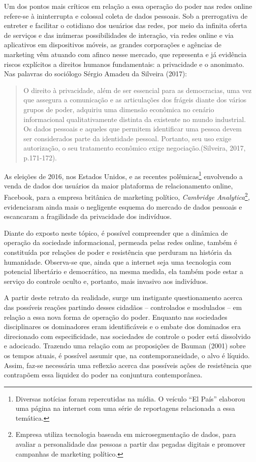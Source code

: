 Um dos pontos mais críticos em relação a essa operação do poder nas
redes online refere-se à ininterrupta e colossal coleta de dados
pessoais. Sob a prerrogativa de entreter e facilitar o cotidiano dos
usuários das redes, por meio da infinita oferta de serviços e das
inúmeras possibilidades de interação, via redes online e via aplicativos
em dispositivos móveis, as grandes corporações e agências de marketing
vêm atuando com afinco nesse mercado, que representa e já evidência
riscos explícitos a direitos humanos fundamentais: a privacidade e o
anonimato. Nas palavras do sociólogo Sérgio Amadeu da Silveira (2017):

\begin{quote}
O direito à privacidade, além de ser essencial para as democracias, uma
vez que assegura a comunicação e as articulações dos frágeis diante dos
vários grupos de poder, adquiriu uma dimensão econômica no cenário
informacional qualitativamente distinta da existente no mundo
industrial. Os dados pessoais e aqueles que permitem identificar uma
pessoa devem ser considerados parte da identidade pessoal. Portanto, seu
uso exige autorização, o seu tratamento econômico exige
negociação.(Silveira, 2017, p.171-172).
\end{quote}

As eleições de 2016, nos Estados Unidos, e as recentes
polêmicas\footnote{Diversas notícias foram repercutidas na mídia. O
  veículo ``El País'' elaborou uma página na internet com uma série de
  reportagens relacionada a essa temática.} envolvendo a venda de dados
dos usuários da maior plataforma de relacionamento online, Facebook,
para a empresa britânica de marketing político, \emph{Cambridge
Analytica}\footnote{Empresa utiliza tecnologia baseada em
  microsegmentação de dados, para avaliar a personalidade das pessoas a
  partir das pegadas digitais e promover campanhas de marketing
  político.}\emph{,} evidenciaram ainda mais o negligente esquema do
mercado de dados pessoais e escancaram a fragilidade da privacidade dos
indivíduos.

Diante do exposto neste tópico, é possível compreender que a dinâmica de
operação da sociedade informacional, permeada pelas redes online, também
é constituída por relações de poder e resistência que perduram na
história da humanidade. Observa-se que, ainda que a internet seja uma
tecnologia com potencial libertário e democrático, na mesma medida, ela
também pode estar a serviço do controle oculto e, portanto, mais
invasivo aos indivíduos.

A partir deste retrato da realidade, surge um instigante questionamento
acerca das possíveis reações partindo desses cidadãos -- controlados e
modulados -- em relação a essa nova forma de operação do poder. Enquanto
nas sociedades disciplinares os dominadores eram identificáveis e o
embate dos dominados era direcionado com especificidade, nas sociedades
de controle o poder está dissolvido e adocicado. Trazendo uma relação
com as proposições de Bauman (2001) sobre os tempos atuais, é possível
assumir que, na contemporaneidade, o alvo é líquido. Assim, faz-se
necessária uma reflexão acerca das possíveis ações de resistência que
contrapõem essa liquidez do poder na conjuntura contemporânea.

